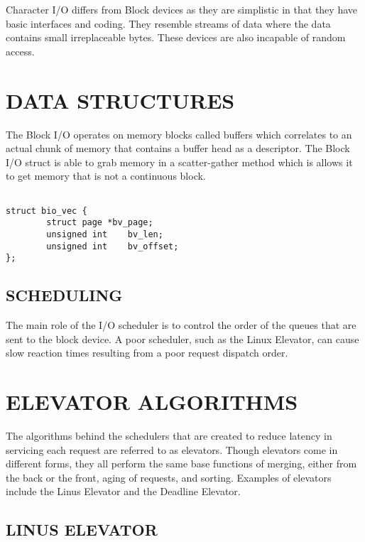 \documentclass[letterpaper, 10 pt, conference]{ieeeconf}  %
\begin{document}
Character I/O differs from Block devices as they are simplistic in that they have basic interfaces and coding. They resemble streams of data where the data contains small irreplaceable bytes. These devices are also incapable of random access.


\section{DATA STRUCTURES}

The Block I/O operates on memory blocks called buffers which correlates to an actual chunk of memory that contains a buffer head as a descriptor. The Block I/O struct is able to grab memory in a scatter-gather method which is allows it to get memory that is not a continuous block.

\begin{lstlisting}[caption={ BIO VEC function that takes in page, length, and offset parameters },label={lst:label}]

struct bio_vec {
        struct page	*bv_page;
       	unsigned int	bv_len;
       	unsigned int	bv_offset;
};
\end{lstlisting}

\subsection{SCHEDULING}

The main role of the I/O scheduler is to control the order of the queues that are sent to the block device. A poor scheduler, such as the Linux Elevator, can cause slow reaction times resulting from a poor request dispatch order.

\section{ELEVATOR ALGORITHMS}

The algorithms behind the schedulers that are created to reduce latency in servicing each request are referred to as elevators. Though elevators come in different forms, they all perform the same base functions of merging, either from the back or the front, aging of requests, and sorting. Examples of elevators include the Linus Elevator and the Deadline Elevator.

\subsection{LINUS ELEVATOR}
\end{document}

